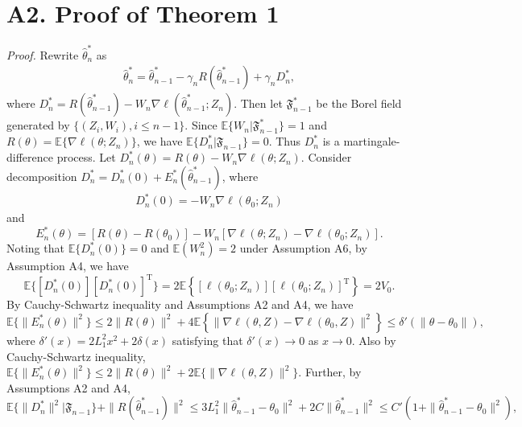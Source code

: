 \documentclass[twoside,11pt]{article}
\def\trans{^{ \mathrm{\scriptscriptstyle T} }}
\def\wh{\widehat}
\begin{document}
\section*{A2. Proof of Theorem 1}

{\it Proof.} Rewrite $\wh{\theta}^*_n$ as
\begin{eqnarray}\label{SGD-wt-rewrite}
\wh{\theta}^*_n = \wh{\theta}^*_{n-1}-\gamma_n R(\wh{\theta}^*_{n-1})+\gamma_n D^*_n,\label{SGD-wt-rewrite}
\end{eqnarray}
where $D^*_n=R(\wh{\theta}^*_{n-1})-W_n\nabla \ell(\wh{\theta}^*_{n-1}; Z_n)$. Then let $\mathfrak{F}^*_{n-1}$ be the Borel field generated by $\{(Z_i, W_i), i\leq n-1\}$.
Since $\mathbb{E}\{W_n|\mathfrak{F}^*_{n-1}\}=1$ and $R(\theta)=\mathbb{E}\{\nabla \ell(\theta; Z_n)\}$, we have $\mathbb{E}\{D^*_n|\mathfrak{F}_{n-1}\}=0$. Thus $D^*_n$ is a martingale-difference process.
Let $D^*_n(\theta)=R(\theta)-W_n\nabla \ell(\theta; Z_n)$. Consider decomposition $D^*_n=D^*_n(0)+E^*_n(\wh{\theta}^*_{n-1})$, where
\begin{eqnarray}
D^*_n(0)=-W_n\nabla \ell(\theta_0; Z_n)
\end{eqnarray}  and
\begin{equation}
E^*_n(\theta)=[R(\theta)-R(\theta_0)]-W_n[\nabla \ell(\theta; Z_n)-\nabla \ell(\theta_0; Z_n)].
\end{equation}
Noting that $\mathbb{E}\{D^*_n(0)\}=0$ and $\mathbb{E}(W_n^2)=2$ under Assumption A6, by Assumption A4, we have
\begin{equation}\label{D-0}
\mathbb{E}\{[D^*_n(0)][D^*_n(0)]\trans\}=2\mathbb{E}\left\{[\ell(\theta_0; Z_n)][\ell(\theta_0; Z_n)]\trans\right\}=2V_0.
\end{equation}
By Cauchy-Schwartz inequality and Assumptions A2 and A4, we have
\begin{equation}\label{E-n}
\mathbb{E}\{\|E_n^*(\theta)\|^2\}\leq 2\|R(\theta)\|^2 + 4\mathbb{E}\left\{\|\nabla \ell(\theta, Z)-\nabla \ell(\theta_0, Z)\|^2\right\}\leq \delta'(\|\theta-\theta_0\|),
\end{equation}
where $\delta'(x)= 2L_1^2x^2+2\delta(x)$ satisfying that $\delta'(x)\rightarrow 0$ as $x\rightarrow 0$. Also by Cauchy-Schwartz inequality, $\mathbb{E}\{\|E^*_n(\theta)\|^2\}\leq 2\|R(\theta)\|^2+2\mathbb{E}\{\|\nabla \ell(\theta, Z)\|^2\}$. Further, by Assumptions A2 and A4,
\begin{equation}\label{D-n}
\mathbb{E}\{\|D_n^*\|^2|\mathfrak{F}_{n-1}\}+\|R(\wh{\theta}^*_{n-1})\|^2\leq 3L_1^2\|\wh{\theta}^*_{n-1}-\theta_0\|^2 + 2C\|\wh{\theta}^*_{n-1}\|^2\leq C' (1+\|\wh{\theta}^*_{n-1}-\theta_0\|^2),
\end{equation}
\end{document}
